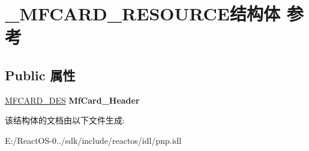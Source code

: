 \hypertarget{struct___m_f_c_a_r_d___r_e_s_o_u_r_c_e}{}\section{\+\_\+\+M\+F\+C\+A\+R\+D\+\_\+\+R\+E\+S\+O\+U\+R\+C\+E结构体 参考}
\label{struct___m_f_c_a_r_d___r_e_s_o_u_r_c_e}
\subsection*{Public 属性}
\begin{DoxyCompactItemize}
\item 
\mbox{\label{struct___m_f_c_a_r_d___r_e_s_o_u_r_c_e_a4979ef1d81550f6b7b2fa3de5d01c0ca}} 
\hyperlink{struct_mf_card___des__s}{M\+F\+C\+A\+R\+D\+\_\+\+D\+ES} {\bfseries Mf\+Card\+\_\+\+Header}
\end{DoxyCompactItemize}


该结构体的文档由以下文件生成\+:\begin{DoxyCompactItemize}
\item 
E\+:/\+React\+O\+S-\/0../sdk/include/reactos/idl/pnp.\+idl\end{DoxyCompactItemize}
